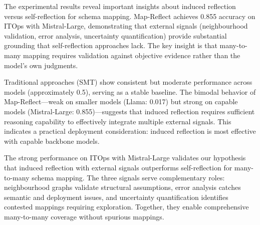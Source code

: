 \documentclass[sigconf, nonacm]{acmart}
\newcommand{\deleted}[1]{\textcolor{red}{#1}}
\begin{document}

The experimental results reveal important insights about induced reflection versus self-reflection for schema mapping. Map-Reflect achieves 0.855 accuracy on ITOps with Mistral-Large, demonstrating that external signals (neighbourhood validation, error analysis, uncertainty quantification) provide substantial grounding that self-reflection approaches lack. The key insight is that many-to-many mapping requires validation against objective evidence rather than the model's own judgments.


Traditional approaches (SMT) show consistent but moderate performance across models (approximately 0.5), serving as a stable baseline. The bimodal behavior of Map-Reflect—weak on smaller models (Llama: 0.017) but strong on capable models (Mistral-Large: 0.855)—suggests that induced reflection requires sufficient reasoning capability to effectively integrate multiple external signals. This indicates a practical deployment consideration: induced reflection is most effective with capable backbone models.


The strong performance on ITOps with Mistral-Large validates our hypothesis that induced reflection with external signals outperforms self-reflection for many-to-many schema mapping. The three signals serve complementary roles: neighbourhood graphs validate structural assumptions, error analysis catches semantic and deployment issues, and uncertainty quantification identifies contested mappings requiring exploration. Together, they enable comprehensive many-to-many coverage without spurious mappings.
\end{document}
